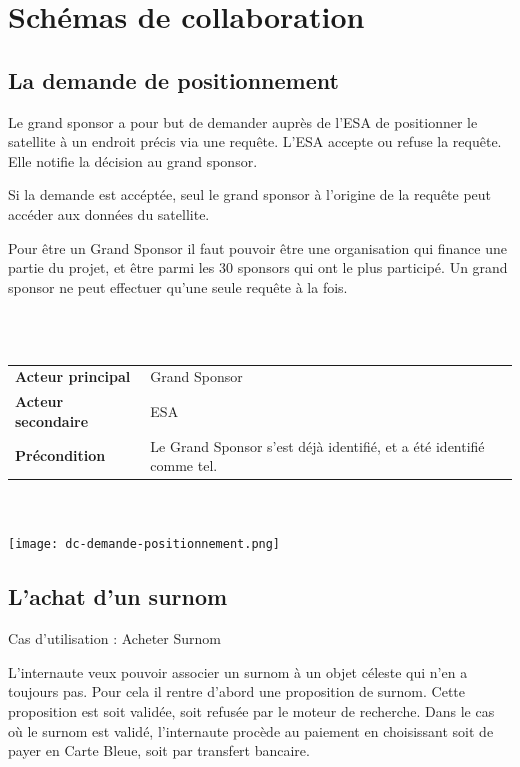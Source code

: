 \documentclass[11pt,a4paper]{article}
\begin{document}
\newpage


\section{Schémas de collaboration}

\subsection{La demande de positionnement}

Le grand sponsor a pour but de demander auprès de l’ESA de positionner le satellite à un endroit précis via une requête. L’ESA accepte ou refuse la requête. Elle notifie la décision au grand sponsor.

Si la demande est accéptée, seul le grand sponsor à l’origine de la requête peut accéder aux données du satellite.

Pour être un Grand Sponsor il faut pouvoir être une organisation qui finance une partie du projet, et être parmi les 30 sponsors qui ont le plus participé. Un grand sponsor ne peut effectuer qu’une seule requête à la fois.

~\\
~\\


\begin{tabular}{ll}
    \textbf{Acteur principal} & Grand Sponsor \\
    \textbf{Acteur secondaire} & ESA \\
    \textbf{Précondition} & Le Grand Sponsor s’est déjà identifié, et a été identifié comme tel.
\end{tabular}
~\\
~\\


\texttt{[image: dc-demande-positionnement.png]}

\newpage

\subsection{L'achat d'un surnom}

Cas d’utilisation : Acheter Surnom

L’internaute veux pouvoir associer un surnom à un objet céleste qui n’en a toujours pas.
Pour cela il rentre d’abord une proposition de surnom. Cette proposition est soit validée, soit refusée par le moteur de recherche.
Dans le cas où le surnom est validé, l’internaute procède au paiement en choisissant soit de payer en Carte Bleue, soit par transfert bancaire.
\end{document}
